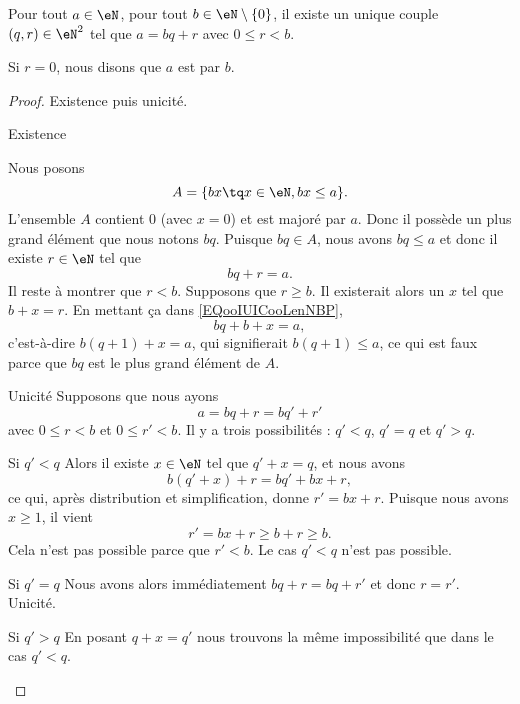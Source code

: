 \begin{theorem}       \label{THOooKDJVooRIJRHP}
	Pour tout \( a\in \eN\), pour tout \( b\in \eN\setminus\{ 0 \}\), il existe un unique couple \( (q,r)\in \eN^2\) tel que \( a=bq+r\) avec \( 0\leq r<b\).

	Si \( r=0\), nous disons que \( a\) est  par \( b\).
\end{theorem}

\begin{proof}
	Existence puis unicité.
	\begin{subproof}
		\item[Existence]

		Nous posons
		\begin{equation}
			A=\{ bx\tq x\in \eN,bx\leq a \}.
		\end{equation}
		L'ensemble \( A\) contient \( 0\) (avec \( x=0\)) et est majoré par \( a\). Donc il possède un plus grand élément que nous notons \( bq\). Puisque \( bq\in A\), nous avons \( bq\leq a\) et donc il existe \( r\in \eN\) tel que
		\begin{equation}        \label{EQooIUICooLenNBP}
			bq+r=a.
		\end{equation}
		Il reste à montrer que \( r<b\). Supposons que \( r\geq b\). Il existerait alors un \( x\) tel que \( b+x=r\). En mettant ça dans \eqref{EQooIUICooLenNBP},
		\begin{equation}
			bq+b+x=a,
		\end{equation}
		c'est-à-dire \( b(q+1)+x=a\), qui signifierait \( b(q+1)\leq a\), ce qui est faux parce que \( bq\) est le plus grand élément de \( A\).
		\item[Unicité]
		Supposons que nous ayons
		\begin{equation}
			a=bq+r=bq'+r'
		\end{equation}
		avec \( 0\leq r<b\) et \( 0\leq r'<b\). Il y a trois possibilités : \( q'<q\), \( q'=q\) et \( q'>q\).
		\begin{subproof}
			\item[Si \( q'<q\)]
			Alors il existe \( x\in \eN\) tel que \( q'+x=q\), et nous avons
			\begin{equation}
				b(q'+x)+r=bq'+bx+r,
			\end{equation}
			ce qui, après distribution et simplification, donne \( r'=bx+r\). Puisque nous avons \( x\geq 1\), il vient
			\begin{equation}
				r'=bx+r\geq b+r\geq b.
			\end{equation}
			Cela n'est pas possible parce que \( r'<b\). Le cas \( q'<q\) n'est pas possible.
			\item[Si \( q'=q\)]
			Nous avons alors immédiatement \( bq+r=bq+r'\) et donc \( r=r'\). Unicité.
			\item[Si \( q'>q\)]
			En posant \( q+x=q'\) nous trouvons la même impossibilité que dans le cas \( q'<q\).
		\end{subproof}
	\end{subproof}
\end{proof}

